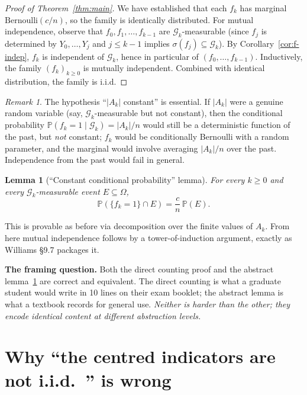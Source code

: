 \documentclass[11pt,a4paper]{article}
\newcommand{\Prob}{\mathbb{P}}
\newcommand{\G}{\mathcal{G}}
\theoremstyle{plain}
\newtheorem{lem}[thm]{Lemma}
\theoremstyle{definition}
\theoremstyle{remark}
\newtheorem*{remark}{Remark}
\begin{document}
\begin{proof}[Proof of Theorem~\ref{thm:main}]
We have established that each $f_k$ has marginal
$\mathrm{Bernoulli}(c/n)$, so the family is identically distributed.
For mutual independence, observe that $f_0, f_1, \dots, f_{k-1}$ are
$\G_k$-measurable (since $f_j$ is determined by $Y_0, \dots, Y_j$ and
$j \leq k - 1$ implies $\sigma(f_j) \subseteq \G_k$). By
Corollary~\ref{cor:f-indep}, $f_k$ is independent of $\G_k$, hence in
particular of $(f_0, \dots, f_{k-1})$. Inductively, the family
$(f_k)_{k \geq 0}$ is mutually independent. Combined with identical
distribution, the family is i.i.d.
\end{proof}

\begin{remark}
The hypothesis ``$|A_k|$ constant'' is essential. If $|A_k|$ were a
genuine random variable (say, $\G_k$-measurable but not constant),
then the conditional probability $\Prob(f_k = 1 \mid \G_k) = |A_k|/n$
would still be a deterministic function of the past, but \emph{not}
constant; $f_k$ would be conditionally Bernoulli with a random
parameter, and the marginal would involve averaging $|A_k|/n$ over
the past. Independence from the past would fail in general.
\end{remark}

\begin{lem}[``Constant conditional probability'' lemma]
\label{lem:cond-law}
For every $k \geq 0$ and every $\G_k$-measurable event
$E \subseteq \Omega$,
\[
  \Prob(\{f_k = 1\} \cap E) = \frac{c}{n}\, \Prob(E).
\]
\end{lem}

This is provable as before via decomposition over the finite values
of $A_k$. From here mutual independence follows by a tower-of-induction
argument, exactly as Williams \S 9.7 packages it.

\textbf{The framing question.} Both the direct counting proof and
the abstract lemma~\ref{lem:cond-law} are correct and equivalent.
The direct counting is what a graduate student would write in 10
lines on their exam booklet; the abstract lemma is what a textbook
records for general use. \emph{Neither is harder than the other; they
encode identical content at different abstraction levels.}

\section{Why ``the centred indicators are not i.i.d.\ '' is wrong}
\end{document}
